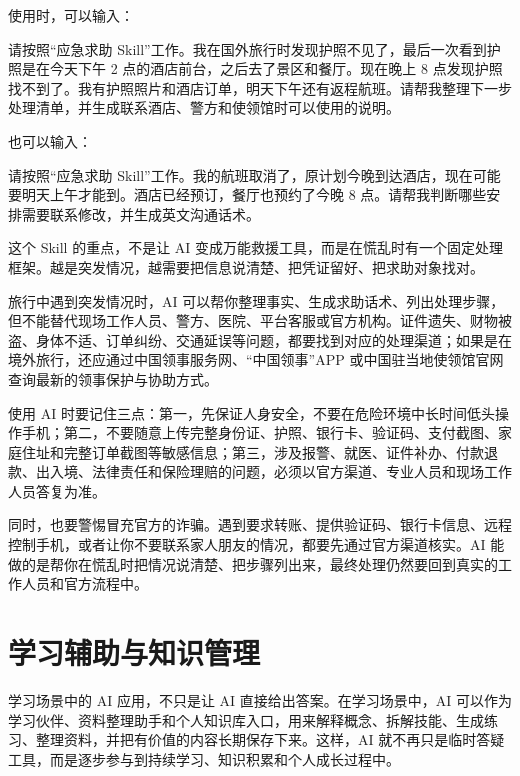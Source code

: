使用时，可以输入：

\begin{tcolorbox}[promptbox]
请按照“应急求助 Skill”工作。我在国外旅行时发现护照不见了，最后一次看到护照是在今天下午 2 点的酒店前台，之后去了景区和餐厅。现在晚上 8 点发现护照找不到了。我有护照照片和酒店订单，明天下午还有返程航班。请帮我整理下一步处理清单，并生成联系酒店、警方和使领馆时可以使用的说明。
\end{tcolorbox}

也可以输入：

\begin{tcolorbox}[promptbox]
请按照“应急求助 Skill”工作。我的航班取消了，原计划今晚到达酒店，现在可能要明天上午才能到。酒店已经预订，餐厅也预约了今晚 8 点。请帮我判断哪些安排需要联系修改，并生成英文沟通话术。
\end{tcolorbox}

这个 Skill 的重点，不是让 AI 变成万能救援工具，而是在慌乱时有一个固定处理框架。越是突发情况，越需要把信息说清楚、把凭证留好、把求助对象找对。


旅行中遇到突发情况时，AI 可以帮你整理事实、生成求助话术、列出处理步骤，但不能替代现场工作人员、警方、医院、平台客服或官方机构。证件遗失、财物被盗、身体不适、订单纠纷、交通延误等问题，都要找到对应的处理渠道；如果是在境外旅行，还应通过中国领事服务网、“中国领事”APP 或中国驻当地使领馆官网查询最新的领事保护与协助方式。

使用 AI 时要记住三点：第一，先保证人身安全，不要在危险环境中长时间低头操作手机；第二，不要随意上传完整身份证、护照、银行卡、验证码、支付截图、家庭住址和完整订单截图等敏感信息；第三，涉及报警、就医、证件补办、付款退款、出入境、法律责任和保险理赔的问题，必须以官方渠道、专业人员和现场工作人员答复为准。

同时，也要警惕冒充官方的诈骗。遇到要求转账、提供验证码、银行卡信息、远程控制手机，或者让你不要联系家人朋友的情况，都要先通过官方渠道核实。AI 能做的是帮你在慌乱时把情况说清楚、把步骤列出来，最终处理仍然要回到真实的工作人员和官方流程中。


\section{学习辅助与知识管理}

学习场景中的 AI 应用，不只是让 AI 直接给出答案。在学习场景中，AI 可以作为学习伙伴、资料整理助手和个人知识库入口，用来解释概念、拆解技能、生成练习、整理资料，并把有价值的内容长期保存下来。这样，AI 就不再只是临时答疑工具，而是逐步参与到持续学习、知识积累和个人成长过程中。

